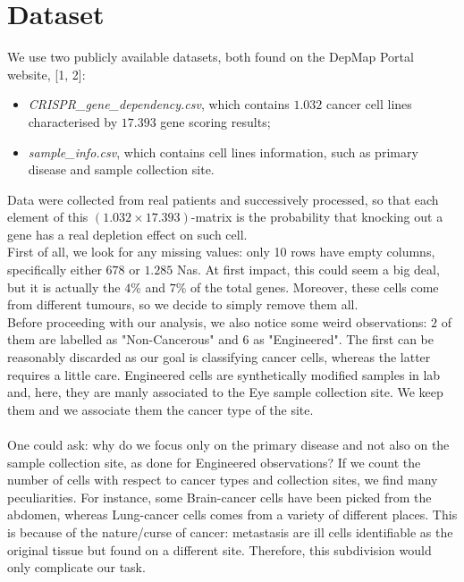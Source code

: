 \documentclass[a4paper,11pt, oneside]{article}  %
\begin{document}
\section{Dataset}
We use two publicly available datasets, both found on the DepMap Portal website, [1, 2]:
\begin{itemize}
	\item \textit{CRISPR\_gene\_dependency.csv}, which contains $1.032$ cancer cell lines characterised by $17.393$ gene scoring results; 
	\item \textit{sample\_info.csv}, which contains cell lines information, such as primary disease and sample collection site.
\end{itemize}
Data were collected from real patients and successively processed, so that each element of this $(1.032 \times 17.393)$-matrix is the probability that knocking out a gene has a real depletion effect on such cell. \\
First of all, we look for any missing values: only 10 rows have empty columns, specifically either $678$ or $1.285$ Nas. At first impact, this could seem a big deal, but it is actually the $4\%$ and $7\%$  of the total genes. Moreover, these cells come from different tumours, so we decide to simply remove them all.  \\
Before proceeding with our analysis, we also notice some weird observations: $2$ of them are labelled as "Non-Cancerous" and $6$ as "Engineered". The first can be reasonably discarded as our goal is classifying cancer cells, whereas the latter requires a little care. Engineered cells are synthetically modified samples in lab and, here, they are manly associated to the Eye sample collection site. We keep them and we associate them the cancer type of the site. \\ \\
One could ask: why do we focus only on the primary disease and not also on the sample collection site, as done for Engineered observations? If we count the number of cells with respect to cancer types and collection sites, we find many peculiarities. For instance, some Brain-cancer cells have been picked from the abdomen, whereas Lung-cancer cells comes from a variety of different places. This is because of the nature/curse of cancer: metastasis are ill cells identifiable as the original tissue but found on a different site. Therefore, this subdivision would only complicate our task. 
\end{document}
